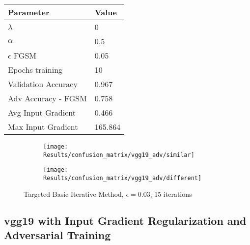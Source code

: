\documentclass[draft,final]{vutinfth} %
\begin{document}
\begin{table}[h]
  \centering
  \begin{tabular}{ll}
    \toprule
			Parameter			& Value   \\
    \midrule
			$\lambda$								& 0				\\
			$\alpha$								& 0.5			\\
			$\epsilon$ FGSM					& 0.05		\\
			Epochs training					& 10			\\
			
			Validation Accuracy			& 0.967		\\ 
			Adv Accuracy - FGSM			& 0.758		\\
			
			Avg Input Gradient			& 0.466	\\
			Max Input Gradient			& 165.864\\
    \bottomrule
  \end{tabular}
\end{table}


\begin{figure}[h]
  \begin{subfigure}[b]{0.5\columnwidth}
		\centering
    \texttt{[image: Results/confusion\_matrix/vgg19\_adv/similar]}
    \label{fig:exp:cm:vgg19_adv:similar}
  \end{subfigure}
  \begin{subfigure}[b]{0.5\columnwidth}
		\centering
    \texttt{[image: Results/confusion\_matrix/vgg19\_adv/different]}
    \label{fig:exp:cm:vgg19_adv:different}
  \end{subfigure}
  \caption{Targeted Basic Iterative Method, $\epsilon = 0.03$, 15 iterations}
  \label{fig:exp:cm:vgg19_adv}
\end{figure}
\clearpage

\subsection{vgg19 with Input Gradient Regularization and Adversarial Training}
\end{document}
